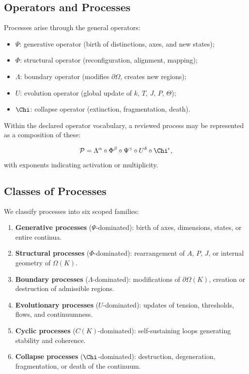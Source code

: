 \subsection{Operators and Processes}

Processes arise through the general operators:

\begin{itemize}
    \item $\Psi$: generative operator (birth of distinctions, axes, and new states);
    \item $\Phi$: structural operator (reconfiguration, alignment, mapping);
    \item $\Lambda$: boundary operator (modifies $\partial\Omega$, creates new regions);
    \item $U$: evolution operator (global update of $k$, $T$, $J$, $P$, $\Theta$);
    \item $\Chi$: collapse operator (extinction, fragmentation, death).
\end{itemize}

Within the declared operator vocabulary, a reviewed process may be represented as a composition of these:

\[
\mathcal{P} =
\Lambda^{\alpha} \circ \Phi^{\beta} \circ \Psi^{\gamma}
\circ U^{\delta} \circ \Chi^{\epsilon},
\]
with exponents indicating activation or multiplicity.

\subsection{Classes of Processes}

We classify processes into six scoped families:

\begin{enumerate}
    \item \textbf{Generative processes} ($\Psi$-dominated):
    birth of axes, dimensions, states, or entire continua.

    \item \textbf{Structural processes} ($\Phi$-dominated):
    rearrangement of $A$, $P$, $J$, or internal geometry of $\Omega(K)$.

    \item \textbf{Boundary processes} ($\Lambda$-dominated):
    modifications of $\partial\Omega(K)$, creation or destruction of
    admissible regions.

    \item \textbf{Evolutionary processes} ($U$-dominated):
    updates of tension, thresholds, flows, and continuumness.

    \item \textbf{Cyclic processes} ($C(K)$-dominated):
    self-sustaining loops generating stability and coherence.

    \item \textbf{Collapse processes} ($\Chi$-dominated):
    destruction, degeneration, fragmentation, or death of the continuum.
\end{enumerate}

